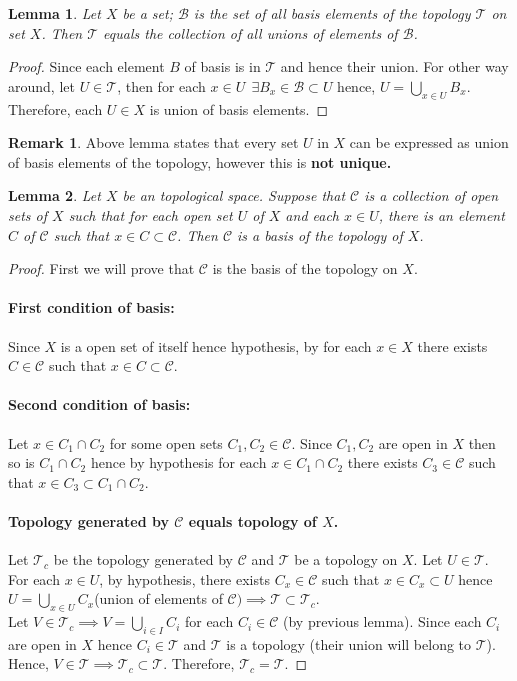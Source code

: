 \documentclass[12pt,reqno]{amsart}
\theoremstyle{plain}
\newtheorem{lem}{Lemma}
\theoremstyle{definition}
\newtheorem{rem}{Remark}
\begin{document}
\begin{lem}
    Let $X$ be a set; $\mathcal{B}$ is the set of all basis elements of the topology $\mathcal{T}$ on set $X$. Then $\mathcal{T}$ equals the collection of all unions of elements of $\mathcal{B}$.
\end{lem}
\begin{proof}
    Since each element $B$ of basis is in $\mathcal{T}$ and hence their union. For other way around, let $U \in \mathcal{T}$, then for each $x \in U~~\exists B_x \in \mathcal{B} \subset U$ hence, $ U = \bigcup\limits_{x \in U} B_x$. Therefore, each $U \in X$ is union of basis elements.
\end{proof}
\begin{rem}
    Above lemma states that every set $U$ in $X$ can be expressed as union of basis elements of the topology, however this is {\bf not unique.}
\end{rem}
\begin{lem}
    Let $X$ be an topological space. Suppose that $\mathcal{C}$ is a collection of open sets of $X$ such that for each open set $U$ of $X$ and each $x \in U$, there is an element $C$ of $\mathcal{C}$ such that $x \in C \subset \mathcal{C}$. Then $\mathcal{C}$ is a basis of the topology of $X$.
\end{lem}
\begin{proof}
    First we will prove that $\mathcal{C}$ is the basis of the topology on $X$.
    \paragraph{\bf First condition of basis:} Since $X$ is a open set of itself hence hypothesis, by for each $x \in X$ there exists $C \in \mathcal{C}$ such that $x \in C \subset \mathcal{C}$.
    \paragraph{\bf Second condition of basis:} Let $x \in C_1 \cap C_2$ for some open sets $C_1, C_2 \in \mathcal{C}$. Since $C_1, C_2$ are open in $X$ then so is $C_1 \cap C_2$ hence by hypothesis for each $x \in C_1 \cap C_2$ there exists $C_3 \in \mathcal{C}$ such that $x \in C_3 \subset C_1 \cap C_2$.
    \paragraph{\bf Topology generated by $\mathcal{C}$ equals topology of $X$.} Let $\mathcal{T}_c$ be the topology generated by $\mathcal{C}$ and $\mathcal{T}$ be a topology on $X$. Let $U \in \mathcal{T}$. For each $x \in U$, by hypothesis, there exists $C_x \in \mathcal{C}$ such that $x \in C_x \subset U$ hence $U = \bigcup\limits_{x \in U} C_x$(union of elements of $\mathcal{C}) \implies \mathcal{T} \subset \mathcal{T}_c$.\\
    Let $V \in \mathcal{T}_c \implies V = \bigcup\limits_{i \in I} C_i$ for each $C_i \in \mathcal{C}$ (by previous lemma). Since each $C_i$ are open in $X$ hence $C_i \in \mathcal{T}$ and $\mathcal{T}$ is a topology (their union will belong to $\mathcal{T}$). Hence, $V \in \mathcal{T} \implies \mathcal{T}_c \subset \mathcal{T}$. Therefore, $\mathcal{T}_c = \mathcal{T}$.
\end{proof}
\end{document}
